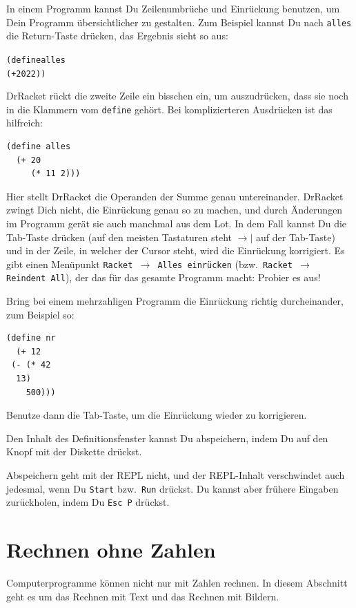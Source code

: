 In einem Programm kannst Du Zeilenumbrüche und Einrückung benutzen, um
Dein Programm übersichtlicher zu gestalten.  Zum Beispiel kannst Du
nach \texttt{alles} die Return-Taste drücken, das Ergebnis sieht so
aus:
%
\begin{alltt}
(define alles
  (+ 20 22))
\end{alltt}
%
DrRacket rückt die zweite Zeile ein bisschen ein, um auszudrücken,
dass sie noch in die Klammern vom \texttt{define} gehört.  Bei
komplizierteren Ausdrücken ist das hilfreich:
%
\begin{verbatim}
(define alles
  (+ 20
     (* 11 2)))
\end{verbatim}
%
Hier stellt DrRacket die Operanden der Summe genau untereinander.
DrRacket zwingt Dich nicht, die Einrückung genau so zu machen, und
durch Änderungen im Programm gerät sie auch manchmal aus dem Lot.  In
dem Fall kannst Du die Tab-Taste drücken (auf den meisten Tastaturen
steht $\longrightarrow\mid$ auf der Tab-Taste) und in der Zeile, in
welcher der Cursor steht, wird die Einrückung korrigiert.  Es gibt
einen Menüpunkt \texttt{Racket $\rightarrow$ Alles einrücken} (bzw.\
\texttt{Racket $\rightarrow$ Reindent All}), der das für das gesamte
Programm macht: Probier es aus!

\begin{aufgabe}
  Bring bei einem mehrzahligen Programm die Einrückung richtig
  durcheinander, zum Beispiel so:
\begin{verbatim}
(define nr
  (+ 12
 (- (* 42
  13)
    500)))
\end{verbatim}
  Benutze dann die Tab-Taste, um die Einrückung wieder zu korrigieren.
\end{aufgabe}
%
Den Inhalt des Definitionsfenster kannst Du abspeichern, indem Du auf
den Knopf mit der Diskette
 drückst.

Abspeichern geht mit der REPL nicht, und der REPL-Inhalt verschwindet
auch jedesmal, wenn Du \texttt{Start} bzw.\ \texttt{Run} drückst.  Du
kannst aber frühere Eingaben zurückholen, indem Du \texttt{Esc~P}
drückst.

\section{Rechnen ohne Zahlen}

Computerprogramme können nicht nur mit Zahlen rechnen.  In diesem
Abschnitt geht es um das Rechnen mit Text und das Rechnen mit Bildern.

